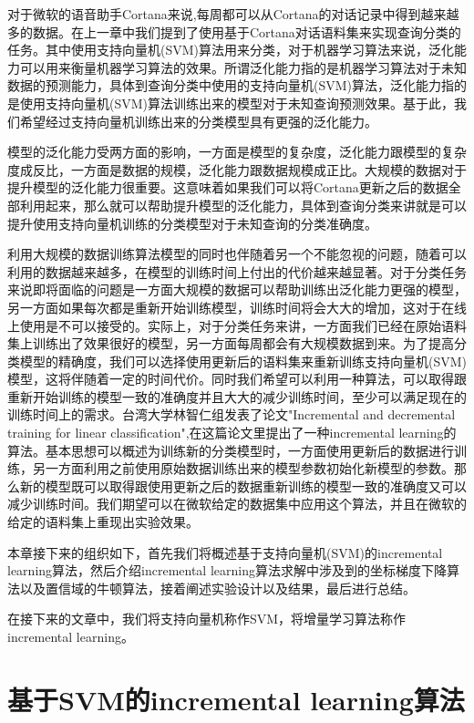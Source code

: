 \documentclass[master]{njuthesis}
\begin{document}
   对于微软的语音助手Cortana来说,每周都可以从Cortana的对话记录中得到越来越多的数据。在上一章中我们提到了使用基于Cortana对话语料集来实现查询分类的任务。其中使用支持向量机(SVM)算法用来分类，对于机器学习算法来说，泛化能力可以用来衡量机器学习算法的效果。所谓泛化能力指的是机器学习算法对于未知数据的预测能力，具体到查询分类中使用的支持向量机(SVM)算法，泛化能力指的是使用支持向量机(SVM)算法训练出来的模型对于未知查询预测效果。基于此，我们希望经过支持向量机训练出来的分类模型具有更强的泛化能力。
   
   模型的泛化能力受两方面的影响，一方面是模型的复杂度，泛化能力跟模型的复杂度成反比，一方面是数据的规模，泛化能力跟数据规模成正比。大规模的数据对于提升模型的泛化能力很重要。这意味着如果我们可以将Cortana更新之后的数据全部利用起来，那么就可以帮助提升模型的泛化能力，具体到查询分类来讲就是可以提升使用支持向量机训练的分类模型对于未知查询的分类准确度。
   
   利用大规模的数据训练算法模型的同时也伴随着另一个不能忽视的问题，随着可以利用的数据越来越多，在模型的训练时间上付出的代价越来越显著。对于分类任务来说即将面临的问题是一方面大规模的数据可以帮助训练出泛化能力更强的模型，另一方面如果每次都是重新开始训练模型，训练时间将会大大的增加，这对于在线上使用是不可以接受的。实际上，对于分类任务来讲，一方面我们已经在原始语料集上训练出了效果很好的模型，另一方面每周都会有大规模数据到来。为了提高分类模型的精确度，我们可以选择使用更新后的语料集来重新训练支持向量机(SVM)模型，这将伴随着一定的时间代价。同时我们希望可以利用一种算法，可以取得跟重新开始训练的模型一致的准确度并且大大的减少训练时间，至少可以满足现在的训练时间上的需求。台湾大学林智仁组发表了论文"Incremental and decremental training for linear classification",在这篇论文里提出了一种incremental learning的算法。基本思想可以概述为训练新的分类模型时，一方面使用更新后的数据进行训练，另一方面利用之前使用原始数据训练出来的模型参数初始化新模型的参数。那么新的模型既可以取得跟使用更新之后的数据重新训练的模型一致的准确度又可以减少训练时间。我们期望可以在微软给定的数据集中应用这个算法，并且在微软的给定的语料集上重现出实验效果。

   本章接下来的组织如下，首先我们将概述基于支持向量机(SVM)的incremental learning算法，然后介绍incremental learning算法求解中涉及到的坐标梯度下降算法以及置信域的牛顿算法，接着阐述实验设计以及结果，最后进行总结。

   在接下来的文章中，我们将支持向量机称作SVM，将增量学习算法称作incremental learning。

\section{基于SVM的incremental learning算法}
\end{document}
